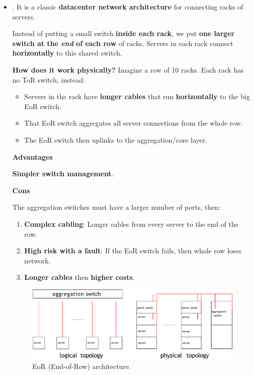 \begin{itemize}
    
    \item {}. It is a classic \textbf{datacenter network architecture} for connecting racks of servers.
    
    Instead of putting a small switch \textbf{inside each rack}, we put \textbf{one larger switch at the \emph{end} of each row} of racks. Servers in each rack connect \textbf{horizontally} to this shared switch.

    \textcolor{Green3}{ \textbf{How does it work physically?}} Imagine a row of 10 racks. Each rack has no ToR switch, instead:
    \begin{itemize}
        \item Servers in the rack have \textbf{longer cables} that run \textbf{horizontally} to the big EoR switch.
        \item That EoR switch aggregates all server connections from the whole row.
        \item The EoR switch then uplinks to the aggregation/core layer.
    \end{itemize}\label{EoR (End-of-Row) architecture}
    
    \begin{flushleft}
        \textcolor{Green3}{ \textbf{Advantages}}
    \end{flushleft}
    \textbf{Simpler switch management}.

    \begin{flushleft}
        \textcolor{Red2}{ \textbf{Cons}}
    \end{flushleft}
    The aggregation switches must have a larger number of ports, then:
    \begin{enumerate}
        \item \textbf{Complex cabling}: Longer cables from every server to the end of the row.
        \item \textbf{High risk with a fault}: If the EoR switch fails, then whole row loses network.
        \item \textbf{Longer cables} then \textbf{higher costs}.
    \end{enumerate}
    \begin{figure}[!htp]
        \centering
        \includegraphics[width=\textwidth]{img/networking-3.pdf}
        \caption{EoR (End-of-Row) architecture.}
    \end{figure}
\end{itemize}

